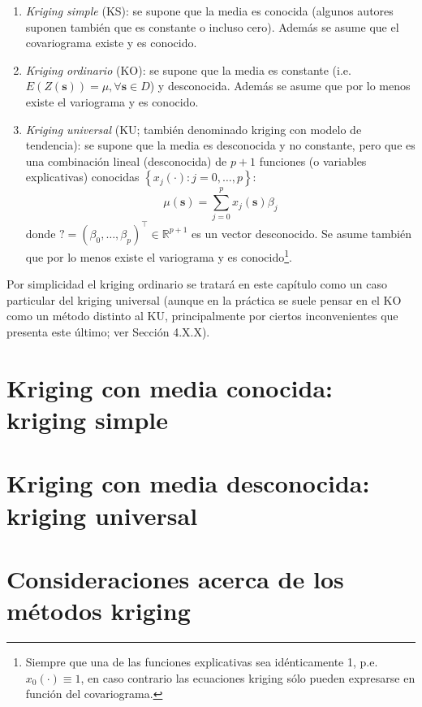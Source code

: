\documentclass[
  spanish,
]{book}
\theoremstyle{break}
\begin{document}
\begin{enumerate}
\def\labelenumi{\arabic{enumi}.}
\item
  \emph{Kriging simple} (KS): se supone que la media es conocida (algunos autores suponen también que es constante o incluso cero).
  Además se asume que el covariograma existe y es conocido.
\item
  \emph{Kriging ordinario} (KO): se supone que la media es constante (i.e.~\(E(Z(\mathbf{s}))=\mu ,\forall \mathbf{s}\in D\)) y desconocida.
  Además se asume que por lo menos existe el variograma y es conocido.
\item
  \emph{Kriging universal} (KU; también denominado kriging con modelo de tendencia): se supone que la media es desconocida y no constante, pero
  que es una combinación lineal (desconocida) de \(p+1\) funciones (o variables explicativas) conocidas \(\left\{ x_{j} (\cdot):j=0, \ldots,p\right\}\):
  \[\mu(\mathbf{s})=\sum\limits_{j=0}^{p}x_{j} (\mathbf{s})\beta_{j}\]
  donde \(?=(\beta_{0} , \ldots,\beta_{p} )^\top \in \mathbb{R}^{p+1}\) es un vector desconocido.
  Se asume también que por lo menos existe el variograma y es conocido\footnote{Siempre que una de las funciones explicativas sea idénticamente 1, p.e. \(x_{0} (\cdot)\equiv 1\), en caso contrario las ecuaciones kriging sólo pueden expresarse en función del covariograma.}.
\end{enumerate}

Por simplicidad el kriging ordinario se tratará en este capítulo como un caso particular del kriging universal (aunque en la práctica se suele
pensar en el KO como un método distinto al KU, principalmente por ciertos inconvenientes que presenta este último; ver Sección 4.X.X).

\hypertarget{ksimple}{%
\section{Kriging con media conocida: kriging simple}\label{ksimple}}

\hypertarget{kuniversal}{%
\section{Kriging con media desconocida: kriging universal}\label{kuniversal}}

\hypertarget{consideraciones-kriging}{%
\section{Consideraciones acerca de los métodos kriging}\label{consideraciones-kriging}}
\end{document}
